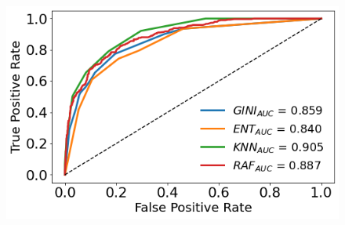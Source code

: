 \documentclass[a4paper,11pt,dvipsnames]{article}
\begin{document}
\begin{figure}[h]
\begin{minipage}[b]{.3\linewidth}
\end{minipage}    \hfil
\begin{minipage}[b]{.3\linewidth}
\centering\includegraphics[width=0.9\linewidth]{dominance_ROC_c.png}\label{fig:domroc}
\end{minipage}


\end{figure}
\end{document}
